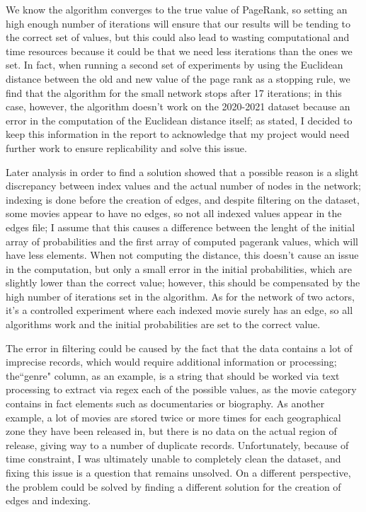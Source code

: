 \documentclass[11pt]{article}
\begin{document}
We know the algorithm converges to the true value of PageRank, so setting an high enough number of iterations will ensure that our results will be tending to the correct set of values, but this could also lead to wasting computational and time resources because it could be that we need less iterations than the ones we set.
In fact, when running a second set of experiments by using the Euclidean distance between the old and new value of the page rank as a stopping rule, we find that the algorithm for the small network stops after 17 iterations; in this case, however, the algorithm doesn't work on the 2020-2021 dataset because an error in the computation of the Euclidean distance itself; as stated, I decided to keep this information in the report to acknowledge that my project would need further work to ensure replicability and solve this issue. 

Later analysis in order to find a solution showed that a possible reason is a slight discrepancy between index values and the actual number of nodes in the network; indexing is done before the creation of edges, and despite filtering on the dataset, some movies appear to have no edges, so not all indexed values appear in the edges file; I assume that this causes a difference between the lenght of the initial array of probabilities and the first array of computed pagerank values, which will have less elements. When not computing the distance, this doesn't cause an issue in the computation, but only a small error in the initial probabilities, which are slightly lower than the correct value; however, this should be compensated by the high number of iterations set in the algorithm. As for the network of two actors, it's a controlled experiment where each indexed movie surely has an edge, so all algorithms work and the initial probabilities are set to the correct value.

The error in filtering could be caused by the fact that the data contains a lot of imprecise records, which would require additional information or processing; the``genre" column, as an example, is a string that should be worked via text processing to extract via regex each of the possible values, as the movie category contains in fact elements such as documentaries or biography. As another example, a lot of movies are stored twice or more times for each geographical zone they have been released in, but there is no data on the actual region of release, giving way to a number of duplicate records.
Unfortunately, because of time constraint, I was ultimately unable to completely clean the dataset, and fixing this issue is a question that remains unsolved.
On a different perspective, the problem could be solved by finding a different solution for the creation of edges and indexing. 
\end{document}
